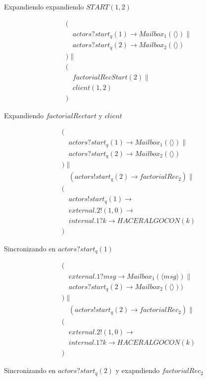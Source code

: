 \documentclass[fleqn]{article}
\newcommand{\myList}[1]{\langle #1 \rangle}
\begin{document}
Expandiendo expandiendo $START(1,2)$

\begin{gather*}
( \\ 
\quad actors?start_q(1) \rightarrow Mailbox_1(\myList{}) \parallel \\
\quad actors?start_q(2) \rightarrow Mailbox_2(\myList{})  \\
) \parallel \\
( \\
\quad factorialRecStart(2) \parallel \\
\quad client(1, 2) \\ 
)
\end{gather*}

Expandiendo $factorialRectart$ y $client$ 

\begin{gather*}
( \\ 
\quad actors?start_q(1) \rightarrow Mailbox_1(\myList{}) \parallel \\
\quad actors?start_q(2) \rightarrow Mailbox_2(\myList{})  \\
) \parallel \\
\quad ( actors!start_q(2) \rightarrow factorialRec_2 ) \parallel \\
( \\
\quad actors!start_q(1) \rightarrow  \\
\quad external.2!(1,0) \rightarrow \\
\quad internal.1?k \rightarrow HACERALGOCON(k) \\ 
)
\end{gather*}

Sincronizando en $actors?start_q(1)$ 

\begin{gather*}
( \\ 
\quad external.1?msg \rightarrow Mailbox_1(\myList{msg})  \parallel \\
\quad actors?start_q(2) \rightarrow Mailbox_2(\myList{}) )  \\
) \parallel \\
\quad ( actors!start_q(2) \rightarrow factorialRec_2 ) \parallel \\
( \\
\quad external.2!(1,0) \rightarrow \\
\quad internal.1?k \rightarrow HACERALGOCON(k) \\ 
)
\end{gather*}

Sincronizando en $actors?start_q(2)$ y exapndiendo $factorialRec_2$
\end{document}
